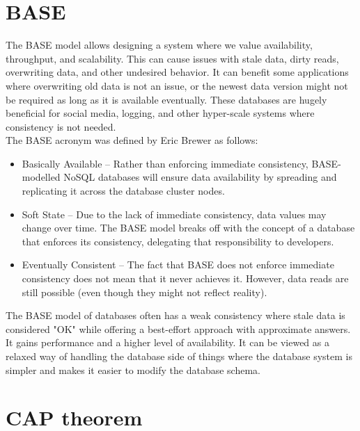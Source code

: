 \documentclass[a4paper,10pt,titlepage]{report}
\begin{document}
    \section{BASE}
    The BASE model allows designing a system where we value availability, throughput, and scalability. This can cause issues with stale data, dirty reads, overwriting data, and other undesired behavior. It can benefit some applications where overwriting old data is not an issue, or the newest data version might not be required as long as it is available eventually. These databases are hugely beneficial for social media, logging, and other hyper-scale systems where consistency is not needed.\\
    \vspace{5mm}
    The BASE acronym was defined by Eric Brewer\cite{brewer2000towards} as follows:

    \begin{itemize}
        \item Basically Available – Rather than enforcing immediate consistency, BASE-modelled NoSQL databases will ensure data availability by spreading and replicating it across the database cluster nodes.
        \item Soft State – Due to the lack of immediate consistency, data values may change over time. The BASE model breaks off with the concept of a database that enforces its consistency, delegating that responsibility to developers.
        \item Eventually Consistent – The fact that BASE does not enforce immediate consistency does not mean that it never achieves it. However, data reads are still possible (even though they might not reflect reality).
    \end{itemize}

    The BASE model of databases often has a weak consistency where stale data is considered "OK" while offering a best-effort approach with approximate answers. It gains performance and a higher level of availability. It can be viewed as a relaxed way of handling the database side of things where the database system is simpler and makes it easier to modify the database schema.

    \section{CAP theorem}
\end{document}

